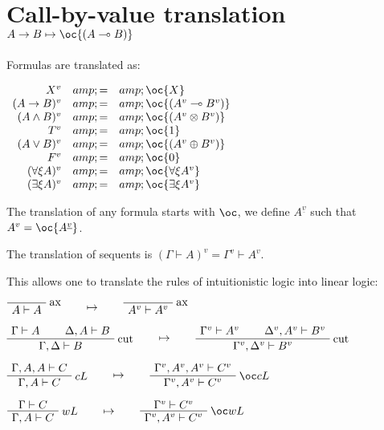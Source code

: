 \section{\texorpdfstring{Call-by-value translation \(A\imp B \mapsto \oc{(A\limp B)}\)}{Call-by-value translation A\textbackslash{}imp B \textbackslash{}mapsto \textbackslash{}oc\{(A\textbackslash{}limp B)\}}}\label{call-by-value-translation-aimp-b-mapsto-ocalimp-b}

Formulas are translated as:

\(\begin{array}{rcl}
X^v &amp; = &amp; \oc{X} \\
(A\imp B)^v &amp; = &amp; \oc{(A^v\limp B^v)} \\
(A\wedge B)^v &amp; = &amp; \oc{(A^v \tens B^v)} \\
T^v &amp; = &amp; \oc{\one} \\
(A\vee B)^v &amp; = &amp; \oc{(A^v\plus B^v)} \\
F^v &amp; = &amp; \oc{\zero} \\
(\forall\xi A)^v &amp; = &amp; \oc{\forall\xi A^v} \\
(\exists\xi A)^v &amp; = &amp; \oc{\exists\xi A^v}
\end{array}\)

The translation of any formula starts with \(\oc\), we define
\(A^{\underline{v}}\) such that \(A^v=\oc{A^{\underline{v}}}\).

The translation of sequents is
\((\Gamma\vdash A)^v = \Gamma^v\vdash A^v\).

This allows one to translate the rules of intuitionistic logic into
linear logic:

\(\LabelRule{\rulename{ax}}
\NulRule{A\vdash A}
\DisplayProof
\qquad\mapsto\qquad
\LabelRule{\rulename{ax}}
\NulRule{A^v\vdash A^v}
\DisplayProof\)

\(\AxRule{\Gamma\vdash A}
\AxRule{\Delta,A\vdash B}
\LabelRule{\rulename{cut}}
\BinRule{\Gamma,\Delta\vdash B}
\DisplayProof
\qquad\mapsto\qquad
\AxRule{\Gamma^v\vdash A^v}
\AxRule{\Delta^v,A^v\vdash B^v}
\LabelRule{\rulename{cut}}
\BinRule{\Gamma^v,\Delta^v\vdash B^v}
\DisplayProof\)

\(\AxRule{\Gamma,A,A\vdash C}
\LabelRule{c L}
\UnaRule{\Gamma,A\vdash C}
\DisplayProof
\qquad\mapsto\qquad
\AxRule{\Gamma^v,A^v,A^v\vdash C^v}
\LabelRule{\oc c L}
\UnaRule{\Gamma^v,A^v\vdash C^v}
\DisplayProof\)

\(\AxRule{\Gamma\vdash C}
\LabelRule{w L}
\UnaRule{\Gamma,A\vdash C}
\DisplayProof
\qquad\mapsto\qquad
\AxRule{\Gamma^v\vdash C^v}
\LabelRule{\oc w L}
\UnaRule{\Gamma^v,A^v\vdash C^v}
\DisplayProof\)

